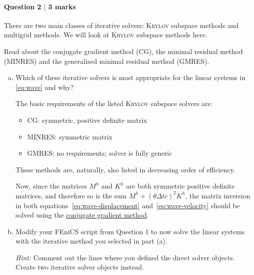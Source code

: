 \newpage
\paragraph*{Question 2 $\vert$ 3 marks}%

There are two main classes of iterative solvers: \textsc{Krylov} subspace methods and multigrid methods. We will look at \textsc{Krylov} subspace methods here.

Read about the conjugate gradient method (CG), the minimal residual method (MINRES) and the generalised minimal residual method (GMRES).

\begin{enumerate}[(a)]
\item Which of these iterative solvers is most appropriate for the linear systems in \eqref{eq:wave} and why?

\vspace{0.25cm}
\begin{solution}
The basic requirements of the listed \textsc{Krylov} subspace solvers are:
\begin{itemize}
\item \textsc{CG:} symmetric, positive definite matrix
\item \textsc{MINRES:} symmetric matrix
\item \textsc{GMRES:} no requirements; solver is fully generic
\end{itemize}
These methods are, naturally, also listed in decreasing order of efficiency. 

Now, since the matrices $M^h$ and $K^h$ are both symmetric positive definite matrices, and therefore so is the sum $M^h + \left(\theta \Delta t c\right)^2 K^h$, the matrix inversion in both equations~\ref{eq:wave-displacement} and~\ref{eq:wave-velocity} should be solved using the \underline{conjugate gradient method}.
\end{solution}

\item Modify your \textsf{FEniCS} script from Question 1 to now solve the linear systems with the iterative method you selected in part (a).

\emph{Hint:} Comment out the lines where you defined the direct solver objects. Create two iterative solver objects instead.

\vspace{0.25cm}
\begin{solution}
\end{solution}


\end{enumerate}
